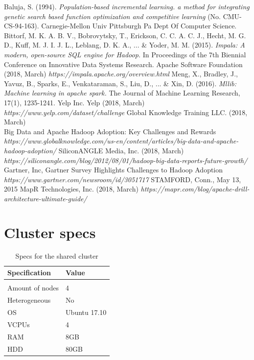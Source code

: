 \documentclass[a4paper,english]{report}
\begin{document}
\begin{thebibliography}{1}
		Baluja, S. (1994). \emph{Population-based incremental learning. a method for integrating genetic search based function optimization and competitive learning} (No. CMU-CS-94-163). Carnegie-Mellon Univ Pittsburgh Pa Dept Of Computer Science.
		Bittorf, M. K. A. B. V., Bobrovytsky, T., Erickson, C. C. A. C. J., Hecht, M. G. D., Kuff, M. J. I. J. L., Leblang, D. K. A., ... \& Yoder, M. M. (2015). \emph{Impala: A modern, open-source SQL engine for Hadoop.} In Proceedings of the 7th Biennial Conference on Innovative Data Systems Research.
		Apache Software Foundation (2018, March) 
		\emph{https://impala.apache.org/overview.html}
		Meng, X., Bradley, J., Yavuz, B., Sparks, E., Venkataraman, S., Liu, D., ... \& Xin, D. (2016). \emph{Mllib: Machine learning in apache spark.} The Journal of Machine Learning Research, 17(1), 1235-1241.
		 Yelp Inc. Yelp (2018, March)
		\emph{https://www.yelp.com/dataset/challenge}
		 Global Knowledge Training LLC. (2018, March)\\
		 Big Data and Apache Hadoop Adoption: Key Challenges and Rewards
		\emph{https://www.globalknowledge.com/us-en/content/articles/big-data-and-apache-hadoop-adoption/}
		SiliconANGLE Media, Inc. (2018, March)
		\emph{https://siliconangle.com/blog/2012/08/01/hadoop-big-data-reports-future-growth/}
		Gartner, Inc, Gartner Survey Highlights Challenges to Hadoop Adoption
		\emph{https://www.gartner.com/newsroom/id/3051717} STAMFORD, Conn., May 13, 2015
		MapR Technologies, Inc. (2018, March)
		\emph{https://mapr.com/blog/apache-drill-architecture-ultimate-guide/}
	\end{thebibliography}

\appendix
\chapter{Cluster specs}
\begin{table}[H]
	\centering
	\caption{Specs for the shared cluster}
	\label{table:cluster_shared}
	\begin{tabular}{ll}
		\\
		\multicolumn{1}{l}{\bfseries Specification} & \multicolumn{1}{l}{\bfseries Value} \\ \hline \\
		Amount of nodes & 4  \\
		Heterogeneous & No  \\
		OS & Ubuntu 17.10  \\
		VCPUs & 4  \\
		RAM & 8GB  \\ 
		HDD & 80GB  \\
	\end{tabular}
\end{table}
\end{document}

